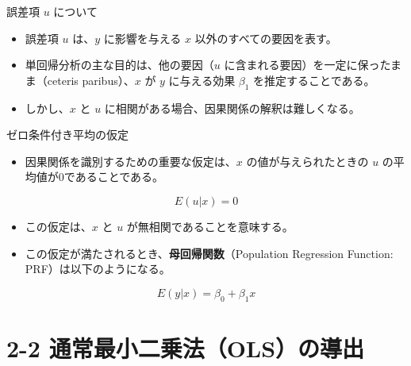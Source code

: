 \documentclass[
  ignorenonframetext,
]{beamer}
\providecommand{\tightlist}{%
  \setlength{\itemsep}{0pt}\setlength{\parskip}{0pt}}
\begin{document}
\begin{frame}{誤差項 \(u\) について}
\protect\hypertarget{ux8aa4ux5deeux9805-u-ux306bux3064ux3044ux3066}{}
\begin{itemize}
\tightlist
\item
  誤差項 \(u\) は、\(y\) に影響を与える \(x\) 以外のすべての要因を表す。
\item
  単回帰分析の主な目的は、他の要因（\(u\)
  に含まれる要因）を一定に保ったまま（ceteris paribus）、\(x\) が \(y\)
  に与える効果 \(\beta_1\) を推定することである。
\item
  しかし、\(x\) と \(u\) に相関がある場合、因果関係の解釈は難しくなる。
\end{itemize}
\end{frame}

\begin{frame}{ゼロ条件付き平均の仮定}
\protect\hypertarget{ux30bcux30edux6761ux4ef6ux4ed8ux304dux5e73ux5747ux306eux4eeeux5b9a}{}
\begin{itemize}
\tightlist
\item
  因果関係を識別するための重要な仮定は、\(x\) の値が与えられたときの
  \(u\) の平均値が0であることである。
\end{itemize}

\[ E(u|x) = 0 \]

\begin{itemize}
\tightlist
\item
  この仮定は、\(x\) と \(u\) が無相関であることを意味する。
\item
  この仮定が満たされるとき、\textbf{母回帰関数}（Population Regression
  Function: PRF）は以下のようになる。
\end{itemize}

\[ E(y|x) = \beta_0 + \beta_1 x \]
\end{frame}

\hypertarget{ux901aux5e38ux6700ux5c0fux4e8cux4e57ux6cd5olsux306eux5c0eux51fa}{%
\section{2-2
通常最小二乗法（OLS）の導出}\label{ux901aux5e38ux6700ux5c0fux4e8cux4e57ux6cd5olsux306eux5c0eux51fa}}
\end{document}
